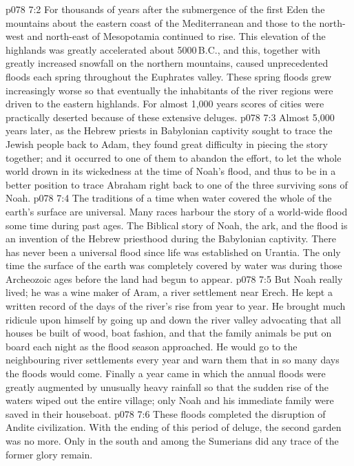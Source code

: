 \vs p078 7:2 For thousands of years after the submergence of the first Eden the mountains about the eastern coast of the Mediterranean and those to the north\hyp{}west and north\hyp{}east of Mesopotamia continued to rise. This elevation of the highlands was greatly accelerated about 5000\,B.C., and this, together with greatly increased snowfall on the northern mountains, caused unprecedented floods each spring throughout the Euphrates valley. These spring floods grew increasingly worse so that eventually the inhabitants of the river regions were driven to the eastern highlands. For almost 1,000 years scores of cities were practically deserted because of these extensive deluges.
\vs p078 7:3 \pc Almost 5,000 years later, as the Hebrew priests in Babylonian captivity sought to trace the Jewish people back to Adam, they found great difficulty in piecing the story together; and it occurred to one of them to abandon the effort, to let the whole world drown in its wickedness at the time of Noah’s flood, and thus to be in a better position to trace Abraham right back to one of the three surviving sons of Noah.
\vs p078 7:4 The traditions of a time when water covered the whole of the earth’s surface are universal. Many races harbour the story of a world\hyp{}wide flood some time during past ages. The Biblical story of Noah, the ark, and the flood is an invention of the Hebrew priesthood during the Babylonian captivity. There has never been a universal flood since life was established on Urantia. The only time the surface of the earth was completely covered by water was during those Archeozoic ages before the land had begun to appear.
\vs p078 7:5 But Noah really lived; he was a wine maker of Aram, a river settlement near Erech. He kept a written record of the days of the river’s rise from year to year. He brought much ridicule upon himself by going up and down the river valley advocating that all houses be built of wood, boat fashion, and that the family animals be put on board each night as the flood season approached. He would go to the neighbouring river settlements every year and warn them that in so many days the floods would come. Finally a year came in which the annual floods were greatly augmented by unusually heavy rainfall so that the sudden rise of the waters wiped out the entire village; only Noah and his immediate family were saved in their houseboat.
\vs p078 7:6 \pc These floods completed the disruption of Andite civilization. With the ending of this period of deluge, the second garden was no more. Only in the south and among the Sumerians did any trace of the former glory remain.
